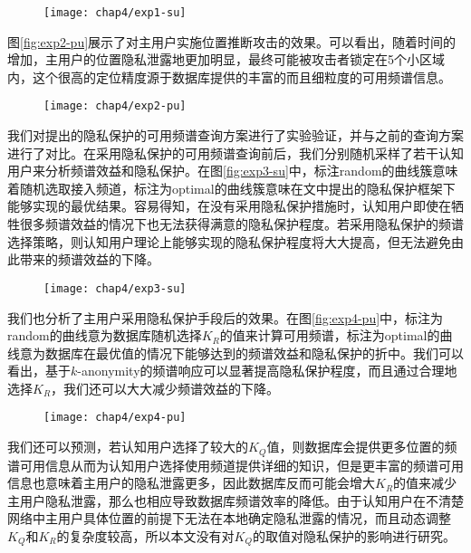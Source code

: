 \begin{figure}[!htp]
  \centering
  \texttt{[image: chap4/exp1-su]}
\end{figure}

图\ref{fig:exp2-pu}展示了对主用户实施位置推断攻击的效果。可以看出，随着时间的增加，主用户的位置隐私泄露地更加明显，最终可能被攻击者锁定在5个小区域内，这个很高的定位精度源于数据库提供的丰富的而且细粒度的可用频谱信息。

\begin{figure}[!htp]
  \centering
  \texttt{[image: chap4/exp2-pu]}
\end{figure}

我们对提出的隐私保护的可用频谱查询方案进行了实验验证，并与之前的查询方案进行了对比。在采用隐私保护的可用频谱查询前后，我们分别随机采样了若干认知用户来分析频谱效益和隐私保护。在图\ref{fig:exp3-su}中，标注random的曲线簇意味着随机选取接入频道，标注为optimal的曲线簇意味在文中提出的隐私保护框架下能够实现的最优结果。容易得知，在没有采用隐私保护措施时，认知用户即使在牺牲很多频谱效益的情况下也无法获得满意的隐私保护程度。若采用隐私保护的频谱选择策略，则认知用户理论上能够实现的隐私保护程度将大大提高，但无法避免由此带来的频谱效益的下降。

\begin{figure}[!htp]
  \centering
  \texttt{[image: chap4/exp3-su]}
\end{figure}

我们也分析了主用户采用隐私保护手段后的效果。在图\ref{fig:exp4-pu}中，标注为random的曲线意为数据库随机选择$K_{R}$的值来计算可用频谱，标注为optimal的曲线意为数据库在最优值的情况下能够达到的频谱效益和隐私保护的折中。我们可以看出，基于$k$-anonymity的频谱响应可以显著提高隐私保护程度，而且通过合理地选择$K_{R}$，我们还可以大大减少频谱效益的下降。

\begin{figure}[!htp]
  \centering
  \texttt{[image: chap4/exp4-pu]}
\end{figure}

我们还可以预测，若认知用户选择了较大的$K_{Q}$值，则数据库会提供更多位置的频谱可用信息从而为认知用户选择使用频道提供详细的知识，但是更丰富的频谱可用信息也意味着主用户的隐私泄露更多，因此数据库反而可能会增大$K_{R}$的值来减少主用户隐私泄露，那么也相应导致数据库频谱效率的降低。由于认知用户在不清楚网络中主用户具体位置的前提下无法在本地确定隐私泄露的情况，而且动态调整$K_{Q}$和$K_{R}$的复杂度较高，所以本文没有对$K_{Q}$的取值对隐私保护的影响进行研究。

